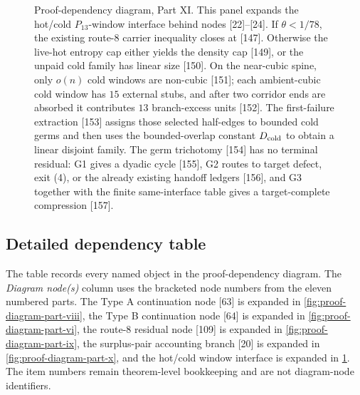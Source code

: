 \documentclass[11pt]{article}
\begin{document}
\begin{figure}[p]
{%
}
\caption[Proof-dependency diagram, Part XI]{Proof-dependency diagram, Part XI.  This panel expands the hot/cold \(P_{13}\)-window interface behind nodes [22]--[24].  If \(\theta<1/78\), the existing route-8 carrier inequality closes at [147].  Otherwise the live-hot entropy cap either yields the density cap [149], or the unpaid cold family has linear size [150].  On the near-cubic spine, only \(o(n)\) cold windows are non-cubic [151]; each ambient-cubic cold window has \(15\) external stubs, and after two corridor ends are absorbed it contributes \(13\) branch-excess units [152].  The first-failure extraction [153] assigns those selected half-edges to bounded cold germs and then uses the bounded-overlap constant \(D_{\rm cold}\) to obtain a linear disjoint family.  The germ trichotomy [154] has no terminal residual: G1 gives a dyadic cycle [155], G2 routes to target defect, exit \textup{(4)}, or the already existing handoff ledgers [156], and G3 together with the finite same-interface table gives a target-complete compression [157].}
\label{fig:proof-diagram-part-xi}
\end{figure}

\clearpage

\subsection*{Detailed dependency table}

The table records every named object in the proof-dependency diagram.  The \emph{Diagram node(s)} column uses the bracketed node numbers from the eleven numbered parts.  The Type A continuation node [63] is expanded in \cref{fig:proof-diagram-part-viii}, the Type B continuation node [64] is expanded in \cref{fig:proof-diagram-part-vi}, the route-8 residual node [109] is expanded in \cref{fig:proof-diagram-part-ix}, the surplus-pair accounting branch [20] is expanded in \cref{fig:proof-diagram-part-x}, and the hot/cold window interface is expanded in \cref{fig:proof-diagram-part-xi}.  The item numbers remain theorem-level bookkeeping and are not diagram-node identifiers.
\end{document}

